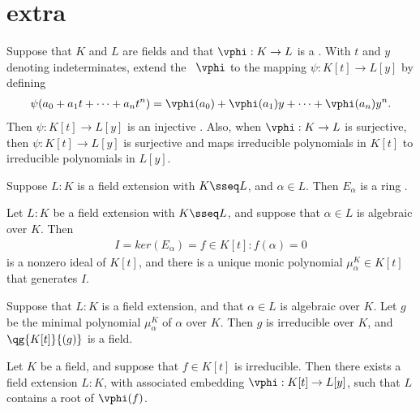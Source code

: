 \documentclass[a4paper]{article}
\begin{document}
\section{extra}
\begin{tproposition}
  Suppose that \( K \) and \( L \) are fields and that \( \vphi : K \to L \) is a \homo. With \( t \) and \( y \) denoting indeterminates, extend the \homo~\( \vphi \) to the mapping \( \psi: K[t] \to L[y] \) by defining \begin{align*}
    \psi(a_0 + a_1t+\cdots + a_n t^n) = \vphi(a_0) + \vphi(a_1)y+\cdots + \vphi(a_n)y^n.
  \end{align*}
  Then \( \psi:K[t]\to L[y] \) is an injective \homo.
  Also, when \( \vphi:K\to L \) is surjective, then \( \psi: K[t]\to L[y] \) is surjective and maps irreducible polynomials in \( K[t] \) to irreducible polynomials in \( L[y] \).
\end{tproposition}

\begin{tproposition}
  Suppose \( L: K \) is a field extension with \( K \sseq L \), and \( \alpha\in L \).  Then \( E_\alpha \) is a ring \homo.
\end{tproposition}

\begin{tproposition}
  Let \( L : K \) be a field extension with \( K \sseq L \), and suppose that \( \alpha\in L \) is algebraic over \( K \).
  Then \begin{align*}
    I = ker(E_\alpha) = {f \in K[t] : f(\alpha) = 0}
  \end{align*}
  is a nonzero ideal of \( K[t] \), and there is a unique monic polynomial \( \mu_\alpha^K \in K[t] \) that generates \( I \).
\end{tproposition}


\begin{ttheorem}
  Suppose that \( L : K \) is a field extension, and that \( \alpha\in L \) is algebraic over \( K \).
  Let \( g \) be the minimal polynomial \( \mu_\alpha^K \) of \( \alpha \) over \( K \).
  Then \( g \) is irreducible over \( K \), and \( \qg{K[t]}{(g)} \) is a field.
\end{ttheorem}

\begin{ttheorem}
  Let \( K \) be a field, and suppose that \( f\in K[t] \) is irreducible.
  Then there exists a field extension \( L:K \), with associated embedding \( \vphi:K[t]\to L[y] \), such that \( L \) contains a root of \( \vphi(f) \).
\end{ttheorem}
\end{document}
